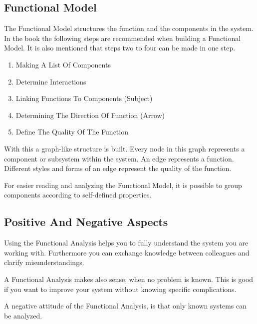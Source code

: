 \subsection{Functional Model}
\label{subsec:functional_model}

The Functional Model structures the function and the components in the system.
In the book the following steps are recommended when building a Functional Model. 
It is also mentioned that steps two to four can be made in one step.

\begin{enumerate}[noitemsep]
	\item Making A List Of Components
	\item Determine Interactions
	\item Linking Functions To Components (Subject)
	\item Determining The Direction Of Function (Arrow)
	\item Define The Quality Of The Function
\end{enumerate}

With this a graph-like structure is built. 
Every node in this graph represents a component or subsystem within the system.
An edge represents a function. 
Different styles and forms of an edge represent the quality of the function.

For easier reading and analyzing the Functional Model, it is possible to group components according to self-defined properties.

\subsection{Positive And Negative Aspects}

Using the Functional Analysis helps you to fully understand the system you are working with.
Furthermore you can exchange knowledge between colleagues and clarify misunderstandings.

A Functional Analysis makes also sense, when no problem is known.
This is good if you want to improve your system without knowing specific complications.

A negative attitude of the Functional Analysis, is that only known systems can be analyzed.
